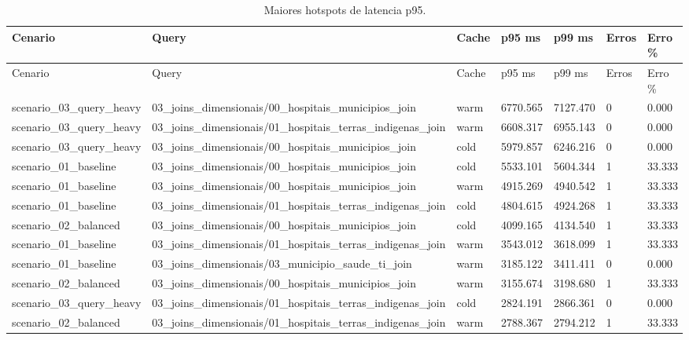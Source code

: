 {
\scriptsize
\setlength{\tabcolsep}{4pt}
\renewcommand{\arraystretch}{1.15}
\begin{longtable}{p{}p{}p{}p{}p{}p{}p{}}
\caption{Maiores hotspots de latencia p95.}\\
\toprule
Cenario & Query & Cache & p95 ms & p99 ms & Erros & Erro \% \\
\midrule
\endfirsthead
\toprule
Cenario & Query & Cache & p95 ms & p99 ms & Erros & Erro \% \\
\midrule
\endhead
scenario\_03\_query\_heavy & 03\_joins\_dimensionais/00\_hospitais\_municipios\_join & warm & 6770.565 & 7127.470 & 0 & 0.000 \\
scenario\_03\_query\_heavy & 03\_joins\_dimensionais/01\_hospitais\_terras\_indigenas\_join & warm & 6608.317 & 6955.143 & 0 & 0.000 \\
scenario\_03\_query\_heavy & 03\_joins\_dimensionais/00\_hospitais\_municipios\_join & cold & 5979.857 & 6246.216 & 0 & 0.000 \\
scenario\_01\_baseline & 03\_joins\_dimensionais/00\_hospitais\_municipios\_join & cold & 5533.101 & 5604.344 & 1 & 33.333 \\
scenario\_01\_baseline & 03\_joins\_dimensionais/00\_hospitais\_municipios\_join & warm & 4915.269 & 4940.542 & 1 & 33.333 \\
scenario\_01\_baseline & 03\_joins\_dimensionais/01\_hospitais\_terras\_indigenas\_join & cold & 4804.615 & 4924.268 & 1 & 33.333 \\
scenario\_02\_balanced & 03\_joins\_dimensionais/00\_hospitais\_municipios\_join & cold & 4099.165 & 4134.540 & 1 & 33.333 \\
scenario\_01\_baseline & 03\_joins\_dimensionais/01\_hospitais\_terras\_indigenas\_join & warm & 3543.012 & 3618.099 & 1 & 33.333 \\
scenario\_01\_baseline & 03\_joins\_dimensionais/03\_municipio\_saude\_ti\_join & warm & 3185.122 & 3411.411 & 0 & 0.000 \\
scenario\_02\_balanced & 03\_joins\_dimensionais/00\_hospitais\_municipios\_join & warm & 3155.674 & 3198.680 & 1 & 33.333 \\
scenario\_03\_query\_heavy & 03\_joins\_dimensionais/01\_hospitais\_terras\_indigenas\_join & cold & 2824.191 & 2866.361 & 0 & 0.000 \\
scenario\_02\_balanced & 03\_joins\_dimensionais/01\_hospitais\_terras\_indigenas\_join & warm & 2788.367 & 2794.212 & 1 & 33.333 \\

\end{longtable}}
